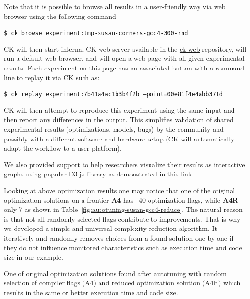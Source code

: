 Note that it is possible to browse all results in a user-friendly way 
via web browser using the following command:

\begin{flushleft}
\texttt{\$ ck browse experiment:tmp-susan-corners-gcc4-300-rnd}
\end{flushleft}

CK will then start internal CK web server 
available in the \href{https://github.com/ctuning/ck-web}{ck-web}
repository, will run a default web browser, and will 
open a web page with all given experimental results.
%
Each experiment on this page has an associated button 
with a command line to replay it via CK such as:                          

\begin{flushleft}
\texttt{\$ ck replay experiment:7b41a4ac1b3b4f2b --point=00e81f4e4abb371d}
\end{flushleft}

CK will then attempt to reproduce this experiment using the same input
and then report any differences in the output.
%
This simplifies validation of shared experimental results 
(optimizations, models, bugs) by the community
and possibly with a different software and hardware setup
(CK will automatically adapt the workflow to a user platform).

We also provided support to help researchers 
visualize their results as interactive graphs 
using popular D3.js library as demonstrated in this 
\href{http://cknowledge.org/repo/web.php?wcid=graph:6b6d77a51c74ec1a&subgraph=rpi3-autotuning-susan-gcc4-interactive}{link}.

Looking at above optimization results one may notice 
that one of the original optimization solutions on a frontier \textbf{A4} 
has ~40 optimization flags, while \textbf{A4R} only 7 as shown in Table~\ref{fig:autotuning-susan-gcc4-reduce}.
%
The natural reason is that not all randomly selected flags contribute to improvements.
%
That is why we developed a simple and universal complexity reduction algorithm.
%
It iteratively and randomly removes choices from a found solution one by one
if they do not influence monitored characteristics such as execution time and code size
in our example.

  \begin{table}[]
    \centering
    \caption{
      One of original optimization solutions found after autotuning with random selection of compiler flags (A4) 
      and reduced optimization solution (A4R) which results in the same or better execution time and code size.
    }
    \label{fig:autotuning-susan-gcc4-reduce}
  \end{table}

